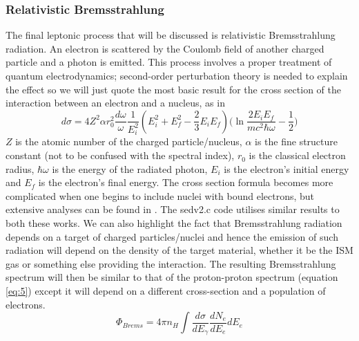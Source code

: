 \documentclass[12pt,a4paper]{article}
\begin{document}
\subsubsection{Relativistic Bremsstrahlung}
The final leptonic process that will be discussed is relativistic Bremsstrahlung radiation. An electron is scattered by the Coulomb field of another charged particle and a photon is emitted. This process involves a proper treatment of quantum electrodynamics; second-order perturbation theory is needed to explain the effect so we will just quote the most basic result for the cross section of the interaction between an electron and a nucleus, as in \cite{1970RvMP...42..237B}
\begin{equation} \label{eq:19}
d\sigma = 4Z^2\alpha r_0^2 \dfrac{d\omega}{\omega}\dfrac{1}{E_i^2}(E_i^2 + E_f^2 - \dfrac{2}{3}E_i E_f)\bigg(\ln{\dfrac{2E_iE_f}{mc^2\hbar \omega}} - \dfrac{1}{2}\bigg)
\end{equation}
$Z$ is the atomic number of the charged particle/nucleus, $\alpha$ is the fine structure constant (not to be confused with the spectral index), $r_0$ is the classical electron radius, $\hbar \omega$ is the energy of the radiated photon, $E_i$ is the electron's initial energy and $E_f$ is the electron's final energy. The cross section formula becomes more complicated when one begins to include nuclei with bound electrons, but extensive analyses can be found in \cite{1969PhRv..185...72G,1959RvMP...31..920K}. The sedv2.c code utilises similar results to both these works. We can also highlight the fact that Bremsstrahlung radiation depends on a target of charged particles/nuclei and hence the emission of such radiation will depend on the density of the target material, whether it be the ISM gas or something else providing the interaction. The resulting Bremsstrahlung spectrum will then be similar to that of the proton-proton spectrum (equation \ref{eq:5}) except it will depend on a different cross-section and a population of electrons.
\begin{equation} \label{eq:brems}
\Phi_{Brems} = 4 \pi n_H \int \dfrac{d\sigma}{dE_\gamma} \dfrac{dN_e}{dE_e} dE_e
\end{equation}\\
\end{document}
